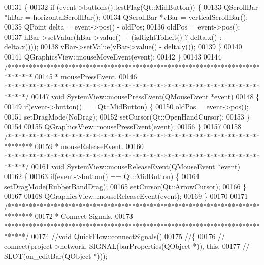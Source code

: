 \begin{DoxyCode}
00131 \{
00132   \textcolor{keywordflow}{if} (event->buttons().testFlag(Qt::MidButton)) \{
00133     QScrollBar *hBar = horizontalScrollBar();
00134     QScrollBar *vBar = verticalScrollBar();
00135     QPoint delta = \textcolor{keyword}{event}->pos() - oldPos;
00136     oldPos = \textcolor{keyword}{event}->pos();
00137     hBar->setValue(hBar->value() + (isRightToLeft() ? delta.x() : -delta.x()));
00138     vBar->setValue(vBar->value() - delta.y());
00139   \}
00140 
00141   QGraphicsView::mouseMoveEvent(event);
00142 \}
00143 
00144 \textcolor{comment}{/*******************************************************************************}
00145 \textcolor{comment}{ * mousePressEvent.}
00146 \textcolor{comment}{ ******************************************************************************/}
\hypertarget{systemview_8cpp_source_l00147}{}\hyperlink{group___graphics_ga42d4a485d6d9bd891d9505a5213cf783}{00147} \textcolor{keywordtype}{void} \hyperlink{group___graphics_ga42d4a485d6d9bd891d9505a5213cf783}{SystemView::mousePressEvent}(QMouseEvent *event)
00148 \{
00149   \textcolor{keywordflow}{if}(event->button() == Qt::MidButton) \{
00150     oldPos = \textcolor{keyword}{event}->pos();
00151     setDragMode(NoDrag);
00152     setCursor(Qt::OpenHandCursor);
00153   \}
00154 
00155   QGraphicsView::mousePressEvent(event);
00156 \}
00157 
00158 \textcolor{comment}{/*******************************************************************************}
00159 \textcolor{comment}{ * mouseReleaseEvent.}
00160 \textcolor{comment}{ ******************************************************************************/}
\hypertarget{systemview_8cpp_source_l00161}{}\hyperlink{group___graphics_gaa8a2664405194bbe29daa454aead7416}{00161} \textcolor{keywordtype}{void} \hyperlink{group___graphics_gaa8a2664405194bbe29daa454aead7416}{SystemView::mouseReleaseEvent}(QMouseEvent *event)
00162 \{
00163   \textcolor{keywordflow}{if}(event->button() == Qt::MidButton) \{
00164     setDragMode(RubberBandDrag);
00165     setCursor(Qt::ArrowCursor);
00166   \}
00167 
00168   QGraphicsView::mouseReleaseEvent(event);
00169 \}
00170 
00171 \textcolor{comment}{/*******************************************************************************}
00172 \textcolor{comment}{ * Connect Signals.}
00173 \textcolor{comment}{ ******************************************************************************/}
00174 \textcolor{comment}{//void QuickFlow::connectSignals()}
00175 \textcolor{comment}{//\{}
00176 \textcolor{comment}{//  connect(project->network, SIGNAL(barProperties(QObject *)), this,}
00177 \textcolor{comment}{//          SLOT(on\_editBar(QObject *)));}

\end{DoxyCode}
